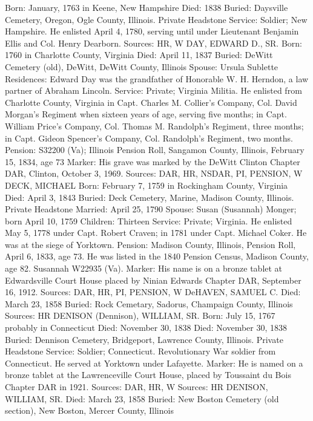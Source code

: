 Born: January, 1763 in Keene, New Hampshire 
Died: 1838 
Buried: Daysville Cemetery, Oregon, Ogle County, Illinois. Private Headstone 
Service: Soldier; New Hampshire. He enlisted April 4, 1780, serving until under Lieutenant Benjamin Ellis and Col. Henry Dearborn.
Sources: HR, W 
DAY, EDWARD D., SR. 
Born: 1760 in Charlotte County, Virginia 
Died: April 11, 1837 
Buried: DeWitt Cemetery (old), DeWitt, DeWitt County, Illinois 
Spouse: Ursula Sublette 
Residences: Edward Day was the grandfather of Honorable W. H. Herndon, a law partner of Abraham Lincoln.
Service: Private; Virginia Militia. He enlisted from Charlotte County, Virginia in Capt. Charles M. Collier's Company, Col. David Morgan's Regiment when sixteen years of age, serving five months; in Capt. William Price's Company, Col. Thomas M. Randolph's Regiment, three months; in Capt. Gideon Spen­cer's Company, Col. Randolph's Regiment, two months. 
Pension: S32200 (Va); Illinois Pension Roll, Sangamon County, Illinois, February 15, 1834, age 73
Marker: His grave was marked by the DeWitt Clinton Chapter DAR, Clinton, October 3, 1969. 
Sources: DAR, HR, NSDAR, PI, PENSION, W 
DECK, MICHAEL 
Born: February 7, 1759 in Rockingham County, Virginia 
Died: April 3, 1843 
Buried: Deck Cemetery, Marine, Madison County, Illinois. Private Headstone 
Married: April 25, 1790 
Spouse: Susan (Susannah) Monger; born April 10, 1759 
Children: Thirteen 
Service: Private; Virginia. He enlisted May 5, 1778 under Capt. Robert Craven; in 1781 under Capt. Michael Coker. He was at the siege of Yorktown. 
Pension: Madison County, Illinois, Pension Roll, April 6, 1833, age 73. He was listed in the 1840 Pension Census, Madison County, age 82. Susannah W22935 (Va). 
Marker: His name is on a bronze tablet at Edwardsville Court House placed by Ninian Edwards Chapter DAR, September 16, 1912. 
Sources: DAR, HR, PI, PENSION, W 
DeHAVEN, SAMUEL C. 
Died: March 23, 1858 
Buried: Rock Cemetary, Sadorus, Champaign County, Illinois
Sources: HR
DENISON (Dennison), WILLIAM, SR.
Born: July 15, 1767 probably in Connecticut Died: November 30, 1838 
Died: November 30, 1838 
Buried: Dennison Cemetery, Bridgeport, Lawrence County, Illinois. Private Headstone 
Service: Soldier; Connecticut. Revolutionary War soldier from Connecticut. He served at Yorktown under Lafayette. 
Marker: He is named on a bronze tablet at the Lawrenceville Court House, placed by Toussaint du Bois Chapter DAR in 1921. 
Sources: DAR, HR, W
Sources: HR 
DENISON, WILLIAM, SR. 
Died: March 23, 1858
Buried: New Boston Cemetery (old section), New Boston, Mercer County, Illinois 
